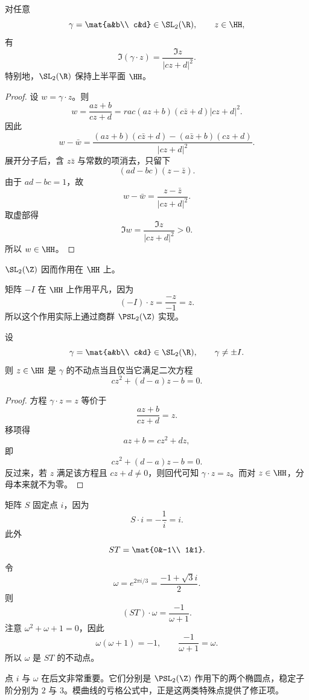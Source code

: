 \begin{lemma}
对任意
\[
\gamma=\mat{a&b\\ c&d}\in \SL_2(\R),\qquad z\in \HH,
\]
有
\[
\Im(\gamma\cdot z)=\frac{\Im z}{|cz+d|^2}.
\]
特别地，$\SL_2(\R)$ 保持上半平面 $\HH$。
\end{lemma}

\begin{proof}
设 $w=\gamma\cdot z$。则
\[
w=\frac{az+b}{cz+d}=rac{(az+b)(c\bar z+d)}{|cz+d|^2}.
\]
因此
\[
w-\bar w
=\frac{(az+b)(c\bar z+d)-(a\bar z+b)(cz+d)}{|cz+d|^2}.
\]
展开分子后，含 $z\bar z$ 与常数的项消去，只留下
\[
(ad-bc)(z-\bar z).
\]
由于 $ad-bc=1$，故
\[
w-\bar w=\frac{z-\bar z}{|cz+d|^2}.
\]
取虚部得
\[
\Im w=\frac{\Im z}{|cz+d|^2}>0.
\]
所以 $w\in\HH$。
\end{proof}

\begin{corollary}
$\SL_2(\Z)$ 因而作用在 $\HH$ 上。
\end{corollary}

\begin{remark}
矩阵 $-I$ 在 $\HH$ 上作用平凡，因为
\[
(-I)\cdot z=\frac{-z}{-1}=z.
\]
所以这个作用实际上通过商群 $\PSL_2(\Z)$ 实现。
\end{remark}

\begin{proposition}
设
\[
\gamma=\mat{a&b\\ c&d}\in \SL_2(\R),\qquad \gamma\ne \pm I.
\]
则 $z\in\HH$ 是 $\gamma$ 的不动点当且仅当它满足二次方程
\[
cz^2+(d-a)z-b=0.
\]
\end{proposition}

\begin{proof}
方程 $\gamma\cdot z=z$ 等价于
\[
\frac{az+b}{cz+d}=z.
\]
移项得
\[
az+b=cz^2+dz,
\]
即
\[
cz^2+(d-a)z-b=0.
\]
反过来，若 $z$ 满足该方程且 $cz+d\ne 0$，则回代可知 $\gamma\cdot z=z$。而对 $z\in\HH$，分母本来就不为零。
\end{proof}

\begin{example}
矩阵 $S$ 固定点 $i$，因为
\[
S\cdot i=-\frac{1}{i}=i.
\]
此外
\[
ST=\mat{0&-1\\ 1&1}.
\]
令
\[
\omega=e^{2\pi i/3}=\frac{-1+\sqrt{3}i}{2}.
\]
则
\[
(ST)\cdot \omega=\frac{-1}{\omega+1}.
\]
注意 $\omega^2+\omega+1=0$，因此
\[
\omega(\omega+1)=-1,
\qquad
\frac{-1}{\omega+1}=\omega.
\]
所以 $\omega$ 是 $ST$ 的不动点。
\end{example}

\begin{remark}
点 $i$ 与 $\omega$ 在后文非常重要。它们分别是 $\PSL_2(\Z)$ 作用下的两个椭圆点，稳定子阶分别为 $2$ 与 $3$。模曲线的亏格公式中，正是这两类特殊点提供了修正项。
\end{remark}

